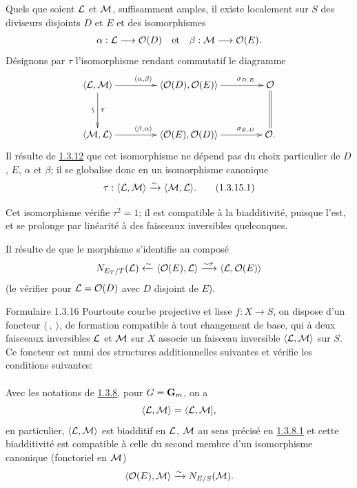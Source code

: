 \documentclass[10pt]{../fichiers-configuration-latex/smfart}
\begin{document}
\subsubsection{}
Quels que soient ${\mathcal L}$ et ${\mathcal M}$, suffisamment amples,
il existe localement sur $S$ des diviseurs disjoints $D$ et $E$ et des
isomorphismes
$$
\alpha:{\mathcal L}\longrightarrow {\mathcal O}(D)\quad \text{et}\quad
\beta:{\mathcal M}\longrightarrow {\mathcal O}(E){}.
$$
Désignons par $\tau$ l'isomorphisme rendant commutatif le diagramme
$$
\xymatrix@C=1.5cm@R=1.25cm{
\langle \Ll,\Mm\rangle  \ar[r]^{\langle \alpha,\beta\rangle }
\ar[d]^{\tau}_{\text{\rotatebox{90}{$\backsim$}}}& \langle \Oo(D), \Oo(E)\rangle  \ar[r]^(.7){\sigma_{D,E}}& \Oo\ar@{=}[d]\\
\langle \Mm,\Ll\rangle  \ar[r]^{\langle \beta,\alpha\rangle }& \langle \Oo(E), \Oo(D)\rangle  \ar[r]^(.7){\sigma_{E,D}}& \Oo.
}
$$
Il résulte de \hyperref[XVIII.prop1.3.12]{1.3.12} que cet isomorphisme ne dépend
pas du choix particulier de $D$, $E$, $\alpha$ et $\beta$; il se globalise donc en
un isomorphisme canonique
\begin{equation*}
\tau:\langle {\mathcal L},{\mathcal M}\rangle \xrightarrow{\sim}
\langle {\mathcal M},{\mathcal L}\rangle {}.\tag{1.3.15.1}
\end{equation*}

Cet isomorphisme vérifie $\tau^{2}=1$; il est compatible à la
biadditivité, puisque  l'est, et se prolonge par linéarité à
des faisceaux inversibles quelconques.

Il résulte de  que le morphisme
 s'identifie au composé
$$
N_{E_{T}/T}({\mathcal L})\xleftarrow{\sim}
\langle {\mathcal O}(E),{\mathcal L}\rangle \xrightarrow{\sim\tau}\langle {\mathcal L},{\mathcal O}(E)\rangle 
$$
(le vérifier pour ${\mathcal L}={\mathcal O}(D)$ avec $D$ disjoint de $E$).

\begin{enonce*}{Formulaire 1.3.16}
Pour\pageoriginale toute courbe projective et lisse $f:X\rightarrow
S$, on dispose d'un foncteur $\langle~,~\rangle $, de formation compatible à tout
changement de base, qui à deux faisceaux inversibles ${\mathcal L}$ et
${\mathcal M}$ sur $X$ associe un faisceau inversible
$\langle {\mathcal L},{\mathcal M}\rangle $ sur $S$. Ce foncteur est muni des
structures additionnelles suivantes et vérifie les conditions
suivantes:
\end{enonce*}

\setcounter{subsubsection}{16}
\paragraph{}
Avec les notations de \hyperref[XVIII.for1.3.8]{1.3.8}, pour $G=\mathbf{G}_{m}$, on a
$$
\langle {\mathcal L},{\mathcal M}\rangle =\langle {\mathcal L},{\mathcal M}]{},
$$
en particulier, $\langle {\mathcal L},{\mathcal M}\rangle $ est biadditif en
${\mathcal L}$, ${\mathcal M}$ au sens précisé en \hyperref[XVIII.par1.3.8.1]{1.3.8.1} et cette
biadditivité est compatible à celle du second membre d'un isomorphisme
canonique (fonctoriel en ${\mathcal M}$)
$$
\langle {\mathcal O}(E),{\mathcal M}\rangle \xrightarrow{\sim} N_{E/S}({\mathcal M}){}.
$$
\end{document}
